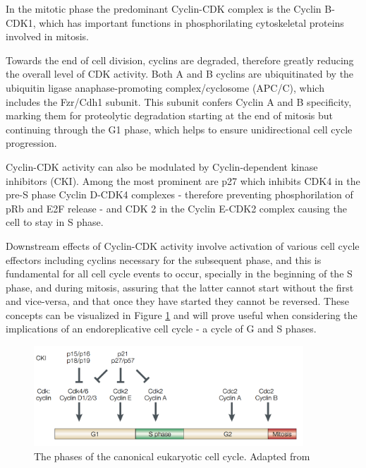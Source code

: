 \documentclass[11pt,twoside,a4paper]{report}
\begin{document}
				In the mitotic phase the predominant Cyclin-CDK complex is the Cyclin B-CDK1, which has important functions in phosphorilating cytoskeletal proteins involved in mitosis.
				
				Towards the end of cell division, cyclins are degraded, therefore greatly reducing the overall level of CDK activity. Both A and B cyclins are ubiquitinated by the ubiquitin ligase anaphase-promoting complex/cyclosome (APC/C), which includes the Fzr/Cdh1 subunit. This subunit confers Cyclin A and B specificity, marking them for proteolytic degradation starting at the end of mitosis but continuing through the G1 phase, which helps to ensure unidirectional cell cycle progression.	
				
				Cyclin-CDK activity can also be modulated by Cyclin-dependent kinase inhibitors (CKI). Among the most prominent are p27 which inhibits CDK4 in the pre-S phase Cyclin D-CDK4 complexes - therefore preventing phosphorilation of pRb and E2F release - and CDK 2 in the Cyclin E-CDK2 complex causing the cell to stay in S phase.
				
				Downstream effects of Cyclin-CDK activity involve activation of various cell cycle effectors including cyclins necessary for the subsequent phase, and this is fundamental for all cell cycle events to occur, specially in the beginning of the S phase, and during mitosis, assuring that the latter cannot start without the first and vice-versa, and that once they have started they cannot be reversed. These concepts can be visualized in Figure \ref{fig:canonical_cycle} and will prove useful when considering the implications of an endoreplicative cell cycle - a cycle of G and S phases.
				
				\begin{figure}[here]
					\centering
					\includegraphics[width=0.9\textwidth]{pngs/canonical_cell_cycle.png}
					\caption{The phases of the canonical eukaryotic cell cycle. {\footnotesize Adapted from \cite{Trimarchi2002}}}
					\label{fig:canonical_cycle}
				\end{figure}
\end{document}
